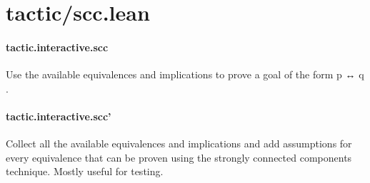 \documentclass{article}
\begin{document}
\section{tactic/scc.lean}\paragraph{tactic.interactive.scc}
\par
Use the available equivalences and implications to prove
a goal of the form 
\colorbox[RGB]{253,246,227}{{{{\color[RGB]{101, 123, 131} p  }}}{{{\color[RGB]{181, 137, 0} ↔ }}}{{{\color[RGB]{101, 123, 131}  q }}}}.
\paragraph{tactic.interactive.scc'}
\par
Collect all the available equivalences and implications and
add assumptions for every equivalence that can be proven using the
strongly connected components technique. Mostly useful for testing.
\end{document}
